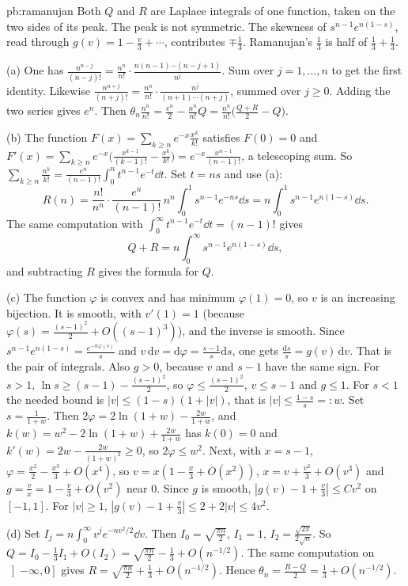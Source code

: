 \begin{solution}{pb:ramanujan}
\idea Both $Q$ and $R$ are Laplace integrals of one function, taken on the two sides of its peak. The peak is not symmetric. The skewness of $s^{n-1}e^{n(1-s)}$, read through
$g(v)=1-\frac v3+\cdots$, contributes $\mp\frac13$. Ramanujan's $\frac13$ is half of $\frac13+\frac13$.

\writeup (a) One has $\frac{n^{n-j}}{(n-j)!}=\frac{n^n}{n!}\cdot\frac{n(n-1)\cdots(n-j+1)}{n^j}$. Sum over $j=1,\dots,n$ to get the first identity. Likewise $\frac{n^{n+j}}{(n+j)!}=\frac{n^n}{n!}\cdot\frac{n^j}{(n+1)\cdots(n+j)}$, summed
over $j\ge0$. Adding the two series gives $e^n$. Then $\theta_n\frac{n^n}{n!}=\frac{e^n}2-\frac{n^n}{n!}Q=\frac{n^n}{n!}\bigl(\frac{Q+R}2-Q\bigr)$.

(b) The function $F(x)=\sum_{k\ge n}e^{-x}\frac{x^k}{k!}$ satisfies $F(0)=0$ and $F'(x)=\sum_{k\ge n}e^{-x}\bigl(\frac{x^{k-1}}{(k-1)!}-\frac{x^k}{k!}\bigr)=e^{-x}\frac{x^{n-1}}{(n-1)!}$, a telescoping sum. So
$\sum_{k\ge n}\frac{n^k}{k!}=\frac{e^n}{(n-1)!}\int_0^nt^{n-1}e^{-t}\dd t$. Set $t=ns$ and use (a):
\[
R(n)=\frac{n!}{n^n}\cdot\frac{e^n}{(n-1)!}\,n^n\int_0^1s^{n-1}e^{-ns}\dd s=n\int_0^1s^{n-1}e^{n(1-s)}\dd s.
\]
The same computation with $\int_0^\infty t^{n-1}e^{-t}\dd t=(n-1)!$ gives
\[
Q+R=n\int_0^\infty s^{n-1}e^{n(1-s)}\dd s,
\]
and subtracting $R$ gives the formula for $Q$.

(c) The function $\varphi$ is convex and has minimum $\varphi(1)=0$, so $v$ is an increasing bijection. It is smooth, with $v'(1)=1$ (because $\varphi(s)=\frac{(s-1)^2}2+O((s-1)^3)$), and the inverse is smooth. Since
$s^{n-1}e^{n(1-s)}=\frac{e^{-n\varphi(s)}}s$ and $v\,\mathrm dv=\mathrm d\varphi=\frac{s-1}s\mathrm ds$, one gets $\frac{\mathrm ds}s=g(v)\,\mathrm dv$. That is the pair of integrals. Also $g>0$, because $v$ and $s-1$ have the same sign.
For $s>1$, $\ln s\ge(s-1)-\frac{(s-1)^2}2$, so $\varphi\le\frac{(s-1)^2}2$, $v\le s-1$ and $g\le1$. For $s<1$ the needed bound is $|v|\le(1-s)(1+|v|)$, that is $|v|\le\frac{1-s}s=:w$. Set $s=\frac1{1+w}$. Then
$2\varphi=2\ln(1+w)-\frac{2w}{1+w}$, and $k(w)=w^2-2\ln(1+w)+\frac{2w}{1+w}$ has $k(0)=0$ and $k'(w)=2w-\frac{2w}{(1+w)^2}\ge0$, so $2\varphi\le w^2$. Next, with $x=s-1$, $\varphi=\frac{x^2}2-\frac{x^3}3+O(x^4)$,
so $v=x(1-\frac x3+O(x^2))$, $x=v+\frac{v^2}3+O(v^3)$ and $g=\frac vx=1-\frac v3+O(v^2)$ near $0$. Since $g$ is smooth, $|g(v)-1+\frac v3|\le Cv^2$ on $[-1,1]$. For $|v|\ge1$,
$|g(v)-1+\frac v3|\le2+2|v|\le4v^2$.

(d) Set $I_j=n\int_0^\infty v^je^{-nv^2/2}\dd v$. Then $I_0=\sqrt{\frac{\pi n}2}$, $I_1=1$, $I_2=\frac{\sqrt{2\pi}}{2\sqrt n}$. So $Q=I_0-\frac13I_1+O(I_2)=\sqrt{\frac{\pi n}2}-\frac13+O(n^{-1/2})$. The same computation on
$\left]-\infty,0\right]$ gives $R=\sqrt{\frac{\pi n}2}+\frac13+O(n^{-1/2})$. Hence $\theta_n=\frac{R-Q}2=\frac13+O(n^{-1/2})$.


\end{solution}
